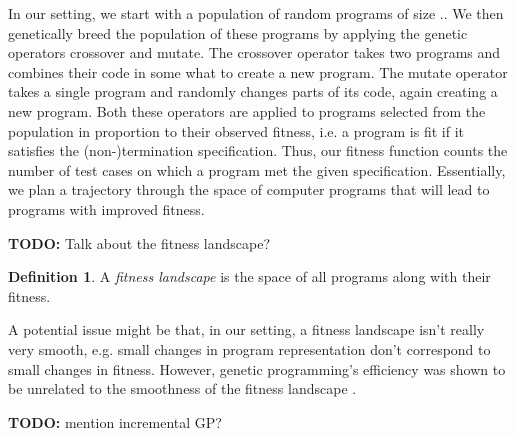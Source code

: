 \documentclass[preprint]{sigplanconf}
\theoremstyle{definition}
\newtheorem{definition}[theorem]{Definition}
\newcommand{\todo}[1]{{\bf TODO:} #1}
\begin{document}
In our setting, we start with a population of random programs of size ..
We then genetically breed the population of these programs by applying the genetic operators 
{\sc crossover} and {\sc mutate}. The crossover operator takes two programs
and combines their code in some what to create a new program.  The mutate operator takes a single
program and randomly changes parts of its code, again creating a new program. 
Both these operators are applied to programs selected from the population in 
proportion to their observed fitness, i.e. a program is fit if it satisfies the (non-)termination specification.
Thus, our fitness function counts the number of test cases on which a program met the given specification.
Essentially, we plan a trajectory through the space of computer programs that will lead to programs with improved fitness.

\todo{Talk about the fitness landscape?}

\begin{definition}
 A \emph{fitness landscape} is the space of all programs along with their fitness.
\end{definition}

A potential issue might be that, in our setting, a fitness landscape isn't really very smooth, e.g. small changes in program representation
don't correspond to small changes in fitness. However, genetic programming's efficiency was shown to be unrelated to the smoothness 
of the fitness landscape \cite{langdon:fogp}.

\todo{mention incremental GP?}

\end{document}
